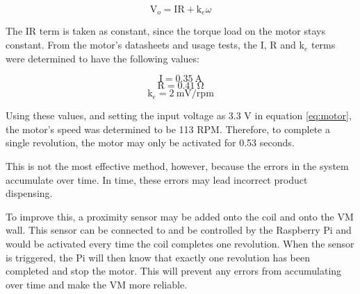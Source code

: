 \begin{equation}
 \label{eq:motor}
 \mathrm{V}_o = \mathrm{IR} + \mathrm{k}_e\omega
\end{equation}

The IR term is taken as constant, since the torque load on the motor stays constant.
From the motor's datasheets and usage tests, the I, R and k$_e$ terms were
determined to have the following values:

\[\mathrm{I} = 0.35\mathrm{\ A}\]
\[\mathrm{R} = 0.41\mathrm{\ \Omega}\]
\[ \mathrm{k}_e = 2 \mathrm{\ mV/rpm}\]

Using these values, and setting the input voltage as 3.3 V in equation
\ref{eq:motor}, the motor's speed was determined to be 113 RPM. Therefore, to
complete a single revolution, the motor may only be activated for 0.53 seconds. 

This is not the most effective method, however, because the errors in the system
accumulate over time. In time, these errors may lead incorrect product
dispensing. 

To improve this, a proximity sensor may be added onto the coil and onto the
VM wall. This sensor can be connected to and be controlled by the
Raspberry Pi and would be activated every time the coil completes one
revolution. When the sensor is triggered, the Pi will then know that exactly
one revolution has been completed and stop the motor. This will prevent any
errors from accumulating over time and make the VM more reliable. 
